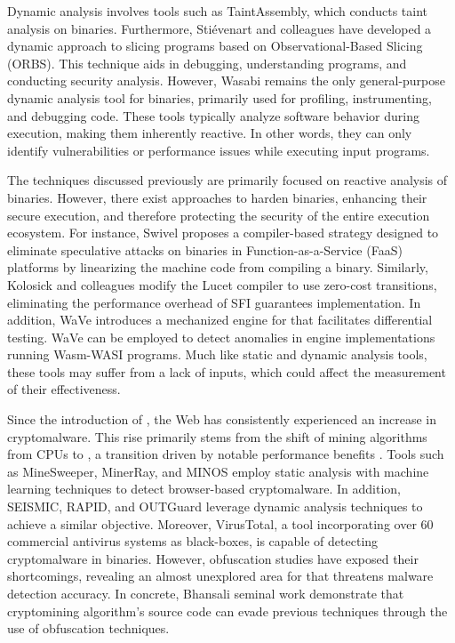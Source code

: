  Dynamic analysis involves tools such as TaintAssembly\cite{taintassembly}, which conducts taint analysis on \Wasm binaries. 
Furthermore, Stiévenart and colleagues have developed a dynamic approach to slicing \Wasm programs based on Observational-Based Slicing (ORBS)\cite{slicing, slicing2}.
This technique aids in debugging, understanding programs, and conducting security analysis.
However, Wasabi\cite{wasabi} remains the only general-purpose dynamic analysis tool for \Wasm binaries, primarily used for profiling, instrumenting, and debugging \Wasm code. 
These tools typically analyze software behavior during execution, making them inherently reactive. 
In other words, they can only identify vulnerabilities or performance issues while executing input \Wasm programs.

The techniques discussed previously are primarily focused on reactive analysis of \Wasm binaries.
However, there exist approaches to harden \Wasm binaries, enhancing their secure execution, and therefore protecting the security of the entire execution ecosystem. 
For instance, Swivel\cite{Swivel} proposes a compiler-based strategy designed to eliminate speculative attacks on \Wasm binaries in Function-as-a-Service (FaaS) platforms by linearizing the machine code from compiling a \Wasm binary. 
Similarly, Kolosick and colleagues \cite{10.1145/3498688} modify the Lucet compiler to use zero-cost transitions, eliminating the performance overhead of SFI guarantees implementation.
In addition, WaVe\cite{wave} introduces a mechanized engine for \Wasm that facilitates differential testing. 
WaVe can be employed to detect anomalies in engine implementations running Wasm-WASI programs. 
Much like static and dynamic analysis tools, these tools may suffer from a lack of \Wasm inputs, which could affect the measurement of their effectiveness.



 Since the introduction of \Wasm, the Web has consistently experienced an increase in cryptomalware. 
This rise primarily stems from the shift of mining algorithms from CPUs to \Wasm, a transition driven by notable performance benefits \cite{musch2019new}.
Tools such as MineSweeper\cite{Minesweeper}, MinerRay\cite{MinerRay}, and MINOS\cite{MINOS} employ static analysis with machine learning techniques to detect browser-based cryptomalware.
In addition, SEISMIC\cite{SEISMIC}, RAPID\cite{RAPID}, and OUTGuard\cite{Outguard} leverage dynamic analysis techniques to achieve a similar objective.
Moreover, VirusTotal, a tool incorporating over 60 commercial antivirus systems as black-boxes, is capable of detecting cryptomalware in \Wasm binaries.
However, obfuscation studies have exposed their shortcomings, revealing an almost unexplored area for \Wasm that threatens malware detection accuracy.
In concrete, Bhansali \etal seminal work\cite{10.1145/3507657.3528560} demonstrate that cryptomining algorithm's source code can evade previous techniques through the use of obfuscation techniques.



